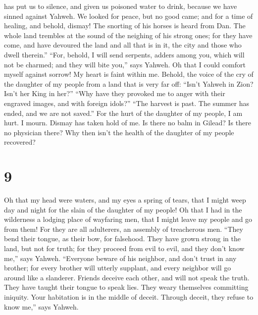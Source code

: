 has put us to silence, and given us poisoned water to drink, because we
have sinned against Yahweh.  We looked for peace, but no
good came; and for a time of healing, and behold, dismay! 
The snorting of his horses is heard from Dan. The whole land trembles at
the sound of the neighing of his strong ones; for they have come, and
have devoured the land and all that is in it, the city and those who
dwell therein.''  ``For, behold, I will send serpents,
adders among you, which will not be charmed; and they will bite you,''
says Yahweh.  Oh that I could comfort myself against
sorrow! My heart is faint within me.  Behold, the voice of
the cry of the daughter of my people from a land that is very far off:
``Isn't Yahweh in Zion? Isn't her King in her?'' ``Why have they
provoked me to anger with their engraved images, and with foreign
idols?''  ``The harvest is past. The summer has ended, and
we are not saved.''  For the hurt of the daughter of my
people, I am hurt. I mourn. Dismay has taken hold of me. 
Is there no balm in Gilead? Is there no physician there? Why then isn't
the health of the daughter of my people recovered?

\hypertarget{section-8}{%
\section{9}\label{section-8}}

 Oh that my head were waters, and my eyes a spring of tears,
that I might weep day and night for the slain of the daughter of my
people!  Oh that I had in the wilderness a lodging place of
wayfaring men, that I might leave my people and go from them! For they
are all adulterers, an assembly of treacherous men.  ``They
bend their tongue, as their bow, for falsehood. They have grown strong
in the land, but not for truth; for they proceed from evil to evil, and
they don't know me,'' says Yahweh.  ``Everyone beware of his
neighbor, and don't trust in any brother; for every brother will utterly
supplant, and every neighbor will go around like a slanderer.
 Friends deceive each other, and will not speak the truth.
They have taught their tongue to speak lies. They weary themselves
committing iniquity.  Your habitation is in the middle of
deceit. Through deceit, they refuse to know me,'' says Yahweh.

